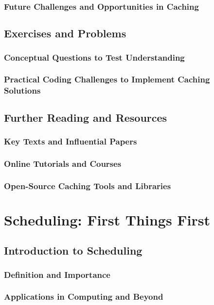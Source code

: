 \documentclass[12pt]{book} %
\begin{document}
\subsection{Future Challenges and Opportunities in Caching}

\section{Exercises and Problems}
\subsection{Conceptual Questions to Test Understanding}
\subsection{Practical Coding Challenges to Implement Caching Solutions}

\section{Further Reading and Resources}
\subsection{Key Texts and Influential Papers}
\subsection{Online Tutorials and Courses}
\subsection{Open-Source Caching Tools and Libraries}


\chapter{Scheduling: First Things First}

\section{Introduction to Scheduling}
\subsection{Definition and Importance}
\subsection{Applications in Computing and Beyond}
\end{document}
